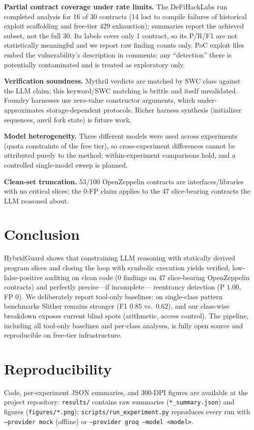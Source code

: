 \documentclass[conference]{IEEEtran}
\newcommand{\system}{HybridGuard}
\begin{document}
\textbf{Partial contract coverage under rate limits.} The DeFiHackLabs run completed analysis for
16 of 30 contracts (14 lost to compile failures of historical exploit scaffolding and free-tier 429
exhaustion); summaries report the achieved subset, not the full 30. Its labels cover only 1
contract, so its P/R/F1 are not statistically meaningful and we report raw finding counts only.
PoC exploit files embed the vulnerability's description in comments; any ``detection'' there is
potentially contaminated and is treated as exploratory only.

\textbf{Verification soundness.} Mythril verdicts are matched by SWC class against the LLM claim;
this keyword/SWC matching is brittle and itself unvalidated. Foundry harnesses use zero-value
constructor arguments, which under-approximates storage-dependent protocols. Richer harness
synthesis (initializer sequences, anvil fork state) is future work.

\textbf{Model heterogeneity.} Three different models were used across experiments (quota
constraints of the free tier), so cross-experiment differences cannot be attributed purely to the
method; within-experiment comparisons hold, and a controlled single-model sweep is planned.

\textbf{Clean-set truncation.} 53/100 OpenZeppelin contracts are interfaces/libraries with no
critical slices; the 0-FP claim applies to the 47 slice-bearing contracts the LLM reasoned about.

\section{Conclusion}
\system{} shows that constraining LLM reasoning with statically derived program slices and closing
the loop with symbolic execution yields verified, low-false-positive auditing on clean code
(0 findings on 47 slice-bearing OpenZeppelin contracts) and perfectly precise---if incomplete---
reentrancy detection (P $1.00$, FP $0$). We deliberately report tool-only baselines: on
single-class pattern benchmarks Slither remains stronger (F1 $0.85$ vs.\ $0.62$), and our
class-wise breakdown exposes current blind spots (arithmetic, access control). The pipeline,
including all tool-only baselines and per-class analyses, is fully open source and reproducible on
free-tier infrastructure.

\section*{Reproducibility}
Code, per-experiment JSON summaries, and 300-DPI figures are available at the project repository:
\texttt{results/} contains raw summaries (\texttt{*\_summary.json}) and figures
(\texttt{figures/*.png}); \texttt{scripts/run\_experiment.py} reproduces every run with
\texttt{--provider mock} (offline) or \texttt{--provider groq --model <model>}.
\end{document}
